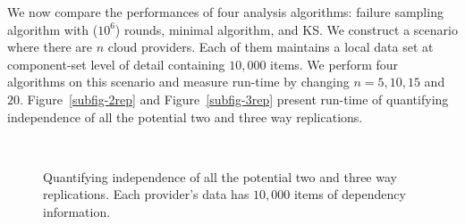 We now compare the performances of four analysis algorithms: 
failure sampling algorithm with ($10^6$) rounds,
minimal \rg algorithm, \pso and KS.
We construct a scenario where there are $n$ cloud providers.
Each of them maintains a local data set
at component-set level of detail containing $10,000$ items.
We perform four algorithms on this scenario
and measure run-time by changing $n=5, 10, 15$ and $20$.
Figure~\ref{subfig-2rep} and Figure~\ref{subfig-3rep}
present run-time of quantifying independence of all the potential 
two and three way replications.

\begin{figure}[tbp] \centering
{}\\\vspace{-0.3cm}\vspace{-0.3cm}
\caption{Quantifying independence of all the potential 
two and three way replications.  Each
provider's data has $10,000$ items of dependency information.} 
\label{fig-compare}
\end{figure}


